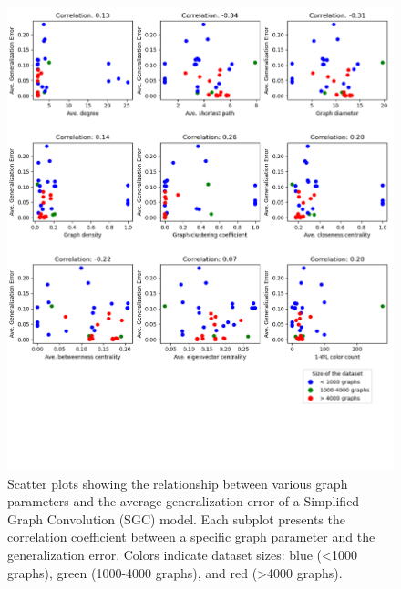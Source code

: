 \begin{figure}[H]
    \centering
    \includegraphics[width=\textwidth]{images/correlation_SGC.png}
    \caption{Scatter plots showing the relationship between various graph parameters and the average generalization error of a Simplified Graph Convolution (SGC) model. Each subplot presents the correlation coefficient between a specific graph parameter and the generalization error. Colors indicate dataset sizes: blue (<1000 graphs), green (1000-4000 graphs), and red (>4000 graphs).}
    \label{fig:correlation_SGC}
\end{figure}

